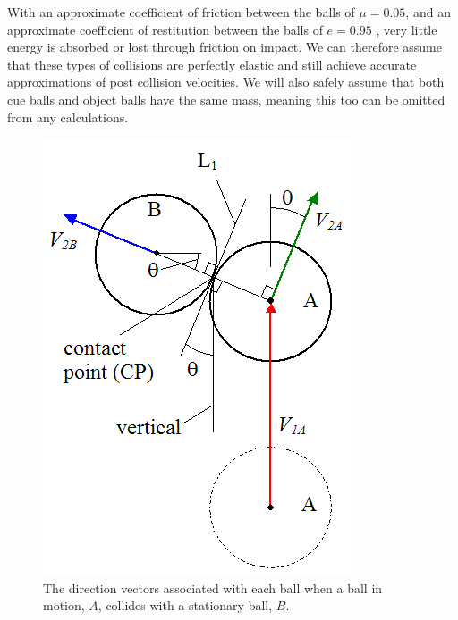 \documentclass[ %
                author={Finn Alexander Wilkinson},
                supervisor={Dr. Andrew Calway},
                degree={MEng},
                title={\centering A Mixed Reality Aim Assistant for Pool and Snooker},
                subtitle={},
                type={Enterprise},
                year={2021} ]{dissertation}
\begin{document}
With an approximate coefficient of friction between the balls of \begin{math}\mu=0.05\end{math}, and an approximate coefficient of restitution between the balls of \begin{math}e=0.95\end{math} \cite{poolPhysicsConstants}, very little energy is absorbed or lost through friction on impact. We can therefore assume that these types of collisions are perfectly elastic \cite{PhysicsOfBilliards} and still achieve accurate approximations of post collision velocities. We will also safely assume that both cue balls and object balls have the same mass, meaning this too can be omitted from any calculations.\\

\begin{figure}[h!]
    \centering
    \includegraphics[scale = 0.5]{Images/ballToBallCollisions.png}
    \caption{The direction vectors associated with each ball when a ball in motion, \(A\), collides with a stationary ball, \(B\). \cite{PhysicsOfBilliards}}
    \label{fig:balltoballcoll}
\end{figure}
\end{document}
